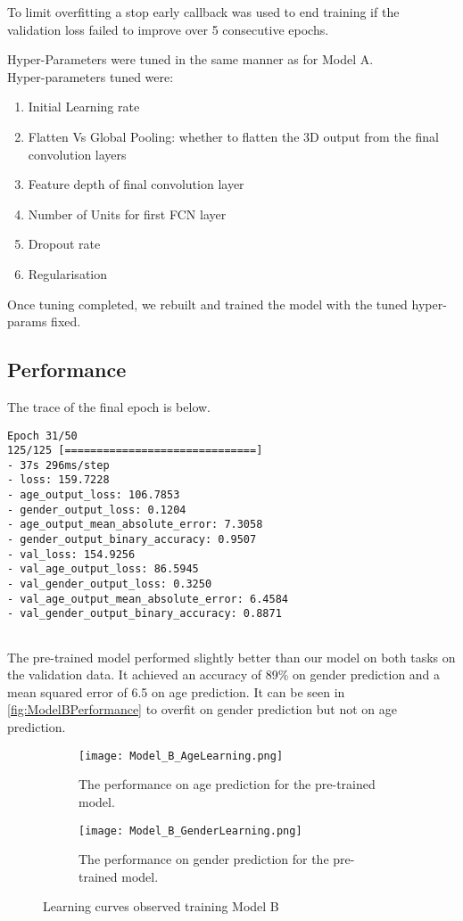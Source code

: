 To limit overfitting a stop early callback was used to end training if the validation loss failed to improve over 5 consecutive epochs.

Hyper-Parameters were tuned in the same manner as for Model A.\\
Hyper-parameters tuned were:
\begin{enumerate}
    \item Initial Learning rate
    \item Flatten Vs Global Pooling: whether to flatten the 3D output from the final convolution layers
    \item Feature depth of final convolution layer 
    \item Number of Units for first FCN layer 
    \item Dropout rate
    \item Regularisation 
\end{enumerate}
Once tuning completed, we rebuilt and trained the model with the tuned hyper-params fixed.


\subsection{Performance}
The trace of the final epoch is below.

\begin{verbatim}
Epoch 31/50
125/125 [==============================] 
- 37s 296ms/step 
- loss: 159.7228 
- age_output_loss: 106.7853 
- gender_output_loss: 0.1204 
- age_output_mean_absolute_error: 7.3058 
- gender_output_binary_accuracy: 0.9507 
- val_loss: 154.9256 
- val_age_output_loss: 86.5945 
- val_gender_output_loss: 0.3250 
- val_age_output_mean_absolute_error: 6.4584 
- val_gender_output_binary_accuracy: 0.8871
    
\end{verbatim}

The pre-trained model performed slightly better than our model on both tasks on the validation data.
It achieved an accuracy of 89\% on gender prediction and a mean squared error of 6.5 on age
prediction. It can be seen in \autoref{fig:ModelBPerformance} to overfit on gender prediction but not on age prediction.


\begin{figure}[h]
    \centering
    \begin{subfigure}{\textwidth}
        \centering
        \texttt{[image: Model\_B\_AgeLearning.png]}
        \caption{\label{fig:ModelBPerformanceAge} The performance on age prediction for the pre-trained model.}
    \end{subfigure}
    \begin{subfigure}{\textwidth}
        \centering
    \texttt{[image: Model\_B\_GenderLearning.png]}
    \caption{\label{fig:ModelBPerformanceGender} The performance on gender prediction for the pre-trained model.}
    \end{subfigure}
    \label{fig:ModelBPerformance}
    \caption{Learning curves observed training Model B}
\end{figure}

